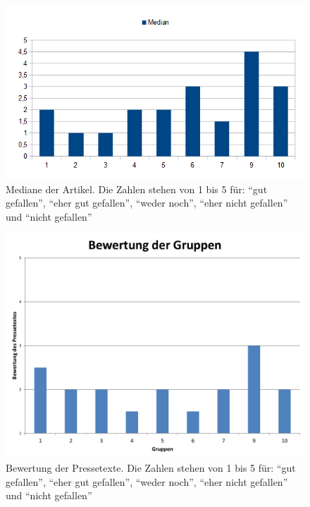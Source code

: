 \begin{figure}[h!tbp]
    \begin{center}
        \includegraphics[width=\textwidth]{images/papers_median}
    \end{center}
    \caption{Mediane der Artikel. Die Zahlen 
    stehen von 1 bis 5 für: \enquote{gut gefallen}, \enquote{eher gut 
    gefallen}, \enquote{weder noch}, \enquote{eher nicht gefallen} und 
    \enquote{nicht gefallen}}
    \label{fig:mediane}
\end{figure}

\begin{figure}[h!tbp]
    \begin{center}
        \includegraphics[width=\textwidth]{images/bewertungen}
    \end{center}
    \caption{Bewertung der Pressetexte. Die Zahlen 
    stehen von 1 bis 5 für: \enquote{gut gefallen}, \enquote{eher gut 
    gefallen}, \enquote{weder noch}, \enquote{eher nicht gefallen} und 
    \enquote{nicht gefallen}}
    \label{fig:bewertungen}
\end{figure}

